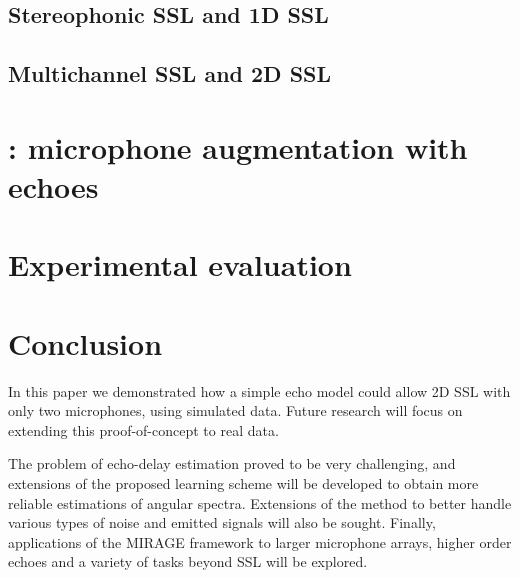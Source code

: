 \subsection{Stereophonic SSL and 1D SSL}


\subsection{Multichannel SSL and 2D SSL}

\section{\mirage: microphone augmentation with echoes}

\section{Experimental evaluation}

\section{Conclusion}
In this paper we demonstrated how a simple echo model could allow 2D SSL with only two microphones, using simulated data.
Future research will focus on extending this proof-of-concept to real data.

The problem of echo-delay estimation proved to be very challenging, and extensions of the proposed learning scheme
will be developed to obtain more reliable estimations of angular spectra.
Extensions of the method to better handle various types of noise and emitted signals will also be sought.
Finally, applications of the MIRAGE framework to larger microphone arrays,
higher order echoes and a variety of tasks beyond SSL will be explored.




